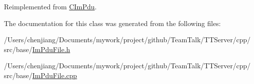 Reimplemented from \hyperlink{class_c_im_pdu_a887912f445b3e864d33f9e7f2325f1fc}{C\+Im\+Pdu}.



The documentation for this class was generated from the following files\+:\begin{DoxyCompactItemize}
\item 
/\+Users/chenjiang/\+Documents/mywork/project/github/\+Team\+Talk/\+T\+T\+Server/cpp/src/base/\hyperlink{_im_pdu_file_8h}{Im\+Pdu\+File.\+h}\item 
/\+Users/chenjiang/\+Documents/mywork/project/github/\+Team\+Talk/\+T\+T\+Server/cpp/src/base/\hyperlink{_im_pdu_file_8cpp}{Im\+Pdu\+File.\+cpp}\end{DoxyCompactItemize}
